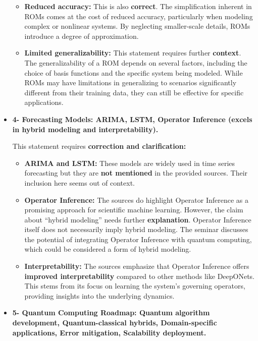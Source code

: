 \documentclass[
]{article}
\begin{document}
\begin{itemize}
\begin{itemize}
  \item
    \textbf{Reduced accuracy:} This is also \textbf{correct}. The
    simplification inherent in ROMs comes at the cost of reduced
    accuracy, particularly when modeling complex or nonlinear systems.
    By neglecting smaller-scale details, ROMs introduce a degree of
    approximation.
  \item
    \textbf{Limited generalizability:} This statement requires further
    \textbf{context}. The generalizability of a ROM depends on several
    factors, including the choice of basis functions and the specific
    system being modeled. While ROMs may have limitations in
    generalizing to scenarios significantly different from their
    training data, they can still be effective for specific
    applications.
  \end{itemize}
\item
  \textbf{4- Forecasting Models: ARIMA, LSTM, Operator Inference (excels
  in hybrid modeling and interpretability).}

  This statement requires \textbf{correction and clarification:}

  \begin{itemize}
  
  \item
    \textbf{ARIMA and LSTM:} These models are widely used in time series
    forecasting but they are \textbf{not mentioned} in the provided
    sources. Their inclusion here seems out of context.
  \item
    \textbf{Operator Inference:} The sources do highlight Operator
    Inference as a promising approach for scientific machine learning.
    However, the claim about ``hybrid modeling'' needs further
    \textbf{explanation}. Operator Inference itself does not necessarily
    imply hybrid modeling. The seminar discusses the potential of
    integrating Operator Inference with quantum computing, which could
    be considered a form of hybrid modeling.
  \item
    \textbf{Interpretability:} The sources emphasize that Operator
    Inference offers \textbf{improved interpretability} compared to
    other methods like DeepONets. This stems from its focus on learning
    the system's governing operators, providing insights into the
    underlying dynamics.
  \end{itemize}
\item
  \textbf{5- Quantum Computing Roadmap: Quantum algorithm development,
  Quantum-classical hybrids, Domain-specific applications, Error
  mitigation, Scalability deployment.}


\end{itemize}
\end{document}
